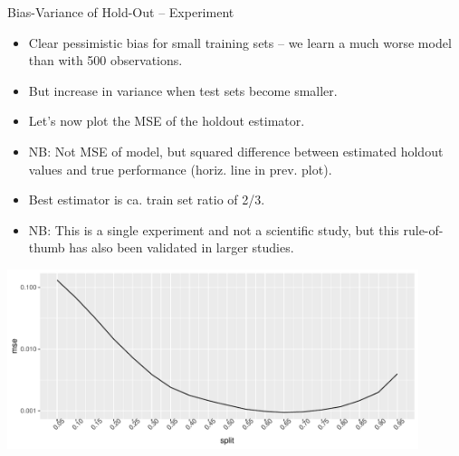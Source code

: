 \begin{vbframe}{Bias-Variance of Hold-Out -- Experiment}
\lz

\begin{itemize}
  \item Clear pessimistic bias for small training sets -- we learn
      a much worse model than with 500 observations. 
  \item But increase in variance when test sets become smaller.
\end{itemize}

\framebreak

\begin{itemize}
  \item Let's now plot the MSE of the holdout estimator.
  \item NB: Not MSE of model, but squared difference between estimated
      holdout values and true performance (horiz. line in 
  prev. plot).
  \item Best estimator is ca. train set ratio of 2/3.
  \item NB: This is a single experiment and not a scientific study, but this 
  rule-of-thumb has also been validated in larger studies.
\end{itemize}

\begin{center}
  \includegraphics[width=0.9\textwidth]{figure/test-holdout-example-2} 
\end{center}

\end{vbframe}


\endlecture

